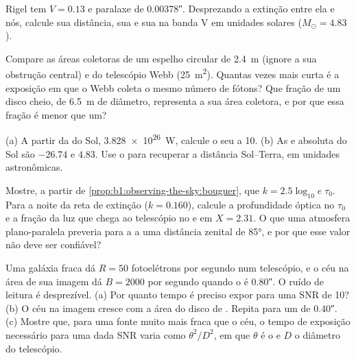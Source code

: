 \begin{exercise}[$\star\star$]\label{exo:b1:observing-the-sky:7}
Rigel tem $V = 0.13$ e paralaxe de \ang{;;0.00378}. Desprezando a extinção entre ela e nós, calcule sua distância, sua  e sua  na banda V em unidades solares ($M_\odot = 4.83$).
\end{exercise}

\begin{exercise}[$\star\star$]\label{exo:b1:observing-the-sky:8}
Compare as áreas coletoras de um espelho circular de \qty{2.4}{m} (ignore a sua obstrução central) e do telescópio Webb (\qty{25}{m^2}). Quantas vezes mais curta é a exposição em que o Webb coleta o mesmo número de fótons? Que fração de um disco cheio, de \qty{6.5}{m} de diâmetro, representa a sua área coletora, e por que essa fração é menor que um?
\end{exercise}

\begin{exercise}[$\star\star$]\label{exo:b1:observing-the-sky:9}
(a) A partir da  do Sol, \qty{3.828e26}{W}, calcule o seu  a \qty{10}{\parsec}. (b) As  e absoluta do Sol são $-26.74$ e $4.83$. Use o  para recuperar a distância Sol--Terra, em unidades astronômicas.
\end{exercise}

\begin{exercise}[$\star\star\star$]\label{exo:b1:observing-the-sky:10}
Mostre, a partir de \cref{prop:b1:observing-the-sky:bouguer}, que $k =
2.5\log_{10}e\;\tau_0$. Para a noite da reta de extinção ($k =
\num{0.160}$), calcule a profundidade óptica no  $\tau_0$ e a fração da luz que chega ao telescópio no  e em $X = 2.31$. O que uma atmosfera plano-paralela preveria para a  a uma distância zenital de \ang{85}, e por que esse valor não deve ser confiável?
\end{exercise}

\begin{exercise}[$\star\star\star$]\label{exo:b1:observing-the-sky:11}
Uma galáxia fraca dá $R = 50$ fotoelétrons por segundo num telescópio, e o céu na área de sua imagem dá $B = \num{2000}$ por segundo quando o  é \ang{;;0.80}. O ruído de leitura é desprezível. (a) Por quanto tempo é preciso expor para uma SNR de 10? (b) O céu na imagem cresce com a área do disco de . Repita para um  de \ang{;;0.40}. (c) Mostre que, para uma fonte muito mais fraca que o céu, o tempo de exposição necessário para uma dada SNR varia como $\theta^2/D^2$, em que $\theta$ é o  e $D$ o diâmetro do telescópio.
\end{exercise}

